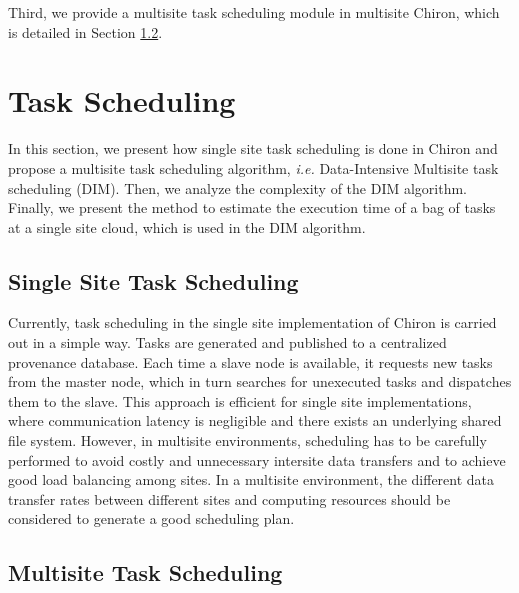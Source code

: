 Third, we provide a multisite task scheduling module in multisite Chiron, which is detailed in Section \ref{subsec:MSTS}. 

\section{Task Scheduling}
\label{sec:FGTS}

In this section, we present how single site task scheduling is done in Chiron and propose a multisite task scheduling algorithm, \textit{i.e.} Data-Intensive Multisite task scheduling
(DIM). Then, we analyze the complexity of the DIM algorithm. Finally, we present the method to estimate the execution time of a bag of tasks at a single site cloud, which is used in the DIM algorithm.

\subsection{Single Site Task Scheduling}
\label{subsec:SSTS}

Currently, task scheduling in the single site implementation of Chiron is carried out in a simple way. Tasks are generated and published to a centralized provenance database. Each time a slave node is available, it requests new tasks from the master node, which in turn searches for unexecuted tasks and dispatches them to the slave. This approach is efficient for single site implementations, where communication latency is negligible and there exists an underlying shared file system. 
However, in multisite environments, scheduling has to be carefully performed to avoid costly and unnecessary intersite data transfers and to achieve good load balancing among  sites. 
In a multisite environment, the different data transfer rates between different sites and computing resources should be considered to generate a good scheduling plan. 

\subsection{Multisite Task Scheduling}
\label{subsec:MSTS}

